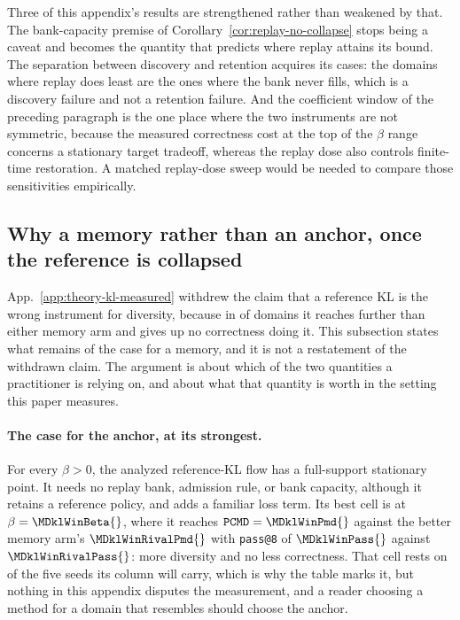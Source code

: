 \documentclass{article}
\newcommand{\1}{\mathbf 1}
\newcommand{\pmd}{\texttt{PCMD}}
\theoremstyle{remark}
\theoremstyle{definition}
\theoremstyle{plain}
\begin{document}
Three of this appendix's results are strengthened rather than weakened by that.
The bank-capacity premise of Corollary~\ref{cor:replay-no-collapse} stops being
a caveat and becomes the quantity that predicts where replay attains its bound.
The separation between discovery and retention acquires its cases: the domains
where replay does least are the ones where the bank never fills, which is a
discovery failure and not a retention failure. And the coefficient window of
the preceding paragraph is the one place where the two instruments are not
symmetric, because the measured correctness cost at the top of the $\beta$
range concerns a stationary target tradeoff, whereas the replay dose also
controls finite-time restoration. A matched replay-dose sweep would be
needed to compare those sensitivities empirically.

\subsection{Why a memory rather than an anchor, once the reference is collapsed}
\label{app:theory-kl-case}

App.~\ref{app:theory-kl-measured} withdrew the claim that a reference KL is the
wrong instrument for diversity, because in \MDklFreeDomains{} of \MDklDomains{}
domains it reaches further than either memory arm and gives up no correctness
doing it. This subsection states what remains of the
case for a memory, and it is not a restatement of the withdrawn claim. The
argument is about which of the two quantities a practitioner is relying on, and
about what that quantity is worth in the setting this paper measures.

\paragraph{The case for the anchor, at its strongest.}
For every $\beta>0$, the analyzed reference-KL flow has a full-support
stationary point. It needs no replay bank, admission rule, or bank capacity,
although it retains a reference policy, and adds a familiar loss term. Its best cell is \MDklWinDomain{} at $\beta=\MDklWinBeta{}$,
where it reaches $\pmd{}=\MDklWinPmd{}$ against the better memory arm's
$\MDklWinRivalPmd{}$ with \texttt{pass@8} of $\MDklWinPass{}$ against
$\MDklWinRivalPass{}$: more diversity and no less correctness. That cell rests on
\MDklWinSeeds{} of the five seeds its column will carry, which is why the table
marks it, but nothing in this appendix disputes the measurement, and a reader
choosing a method for a domain that resembles \MDklWinDomain{} should choose
the anchor.
\end{document}
